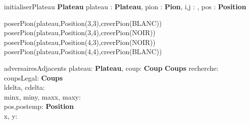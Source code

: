 \begin{algorithme}
  \small
  \fonction
      {initialiserPlateau}
      {}
      {\textbf{Plateau}}
      {plateau : \textbf{Plateau}, pion : \textbf{Pion}, i,j : \naturel, pos : \textbf{Position}}
      { 

        poserPion(plateau,Position(3,3),creerPion(BLANC))\\
        poserPion(plateau,Position(3,4),creerPion(NOIR))\\
        poserPion(plateau,Position(4,3),creerPion(NOIR))\\
        poserPion(plateau,Position(4,4),creerPion(BLANC))\\
      }
\end{algorithme}

\vspace{5mm}

\begin{algorithme}
  \small
  \fonction
      {adversairesAdjacents}
      {plateau: \textbf{Plateau}, coup: \textbf{Coup}}
      {\textbf{Coups}}
      {
        recherche: \booleen\\
        coupsLegal: \textbf{Coups}\\
        ldelta, cdelta: \entier\\
        minx, miny, maxx, maxy: \entier\\
        pos,postemp: \textbf{Position}\\
        x, y: \entier\\
      }
      {
                {
                          {
                                    {
                                              {
                                              }
                                    }
                          }
                }
      }
\end{algorithme}

